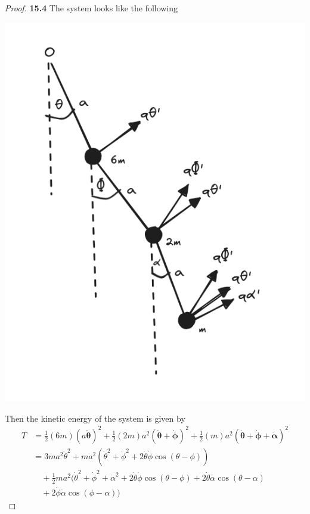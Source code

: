 \documentclass[11pt]{article}
\theoremstyle{definition}
\begin{document}
\begin{proof}{\textbf{15.4}}
    The system looks like the following
    \begin{center}
        \includegraphics[scale=0.45]{ch15-4.png}
    \end{center}
    Then the kinetic energy of the system is given by
    \begin{align*}
        T &= \frac{1}{2}(6m)(a\bm{\dot\theta})^2
        + \frac{1}{2}(2m)a^2(\bm{\dot\theta} + \bm{\dot\phi})^2
        + \frac{1}{2}(m)a^2(\bm{\dot\theta} + \bm{\dot\phi} + \bm{\dot\alpha})^2\\
        &= 3ma^2\dot\theta^2
        + ma^2(\dot\theta^2 + \dot\phi^2 
        + 2\dot\theta\dot\phi\cos(\theta - \phi))\\
        &\quad+ \frac{1}{2}ma^2(\dot\theta^2 + \dot\phi^2 + \dot\alpha^2 
        + 2\dot\theta\dot\phi\cos(\theta - \phi)
        + 2\dot\theta\dot\alpha\cos(\theta - \alpha)\\
        &\quad + 2\dot\phi\dot\alpha\cos(\phi - \alpha))
    \end{align*}

\end{proof}
\end{document}
